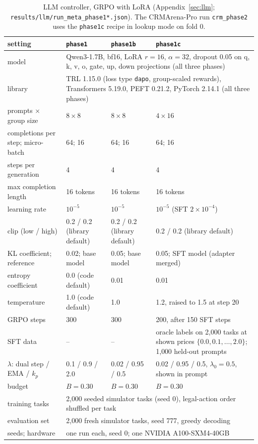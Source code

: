 \documentclass[10pt]{article}
\newcommand{\code}[1]{\texttt{#1}}
\begin{document}
\begin{table}[H]
\centering\footnotesize
\caption{LLM controller, GRPO with LoRA (Appendix~\ref{sec:llm}; \code{results/llm/run\_meta\_phase1*.json}). The CRMArena-Pro run \code{crm\_phase2} uses the \code{phase1c} recipe in lookup mode on fold 0.}
\label{tab:det-llm}
\begin{tabular}{p{4.0cm}p{3.6cm}p{3.6cm}p{3.8cm}}
\toprule
setting & \code{phase1} & \code{phase1b} & \code{phase1c} \\
\midrule
model & \multicolumn{3}{p{11.4cm}}{Qwen3-1.7B, bf16, LoRA $r=16$, $\alpha=32$, dropout 0.05 on q, k, v, o, gate, up, down projections (all three phases)} \\
library & \multicolumn{3}{p{11.4cm}}{TRL 1.15.0 (loss type \code{dapo}, group-scaled rewards), Transformers 5.19.0, PEFT 0.21.2, PyTorch 2.14.1 (all three phases)} \\
prompts $\times$ group size & $8\times8$ & $8\times8$ & $4\times16$ \\
completions per step; micro-batch & 64; 16 & 64; 16 & 64; 16 \\
steps per generation & 4 & 4 & 4 \\
max completion length & 16 tokens & 16 tokens & 16 tokens \\
learning rate & $10^{-5}$ & $10^{-5}$ & $10^{-5}$ (SFT $2\times10^{-4}$) \\
clip (low / high) & 0.2 / 0.2 (library default) & 0.2 / 0.2 (library default) & 0.2 / 0.2 (library default) \\
KL coefficient; reference & 0.02; base model & 0.05; base model & 0.05; SFT model (adapter merged) \\
entropy coefficient & 0.0 (code default) & 0.01 & 0.01 \\
temperature & 1.0 (code default) & 1.0 & 1.2, raised to 1.5 at step 20 \\
GRPO steps & 300 & 300 & 200, after 150 SFT steps \\
SFT data & -- & -- & oracle labels on 2{,}000 tasks at shown prices $\{0.0,0.1,\dots,2.0\}$; 1{,}000 held-out prompts \\
$\lambda$: dual step / EMA / $k_p$ & 0.1 / 0.9 / 2.0 & 0.02 / 0.95 / 0.5 & 0.02 / 0.95 / 0.5, $\lambda_0=0.5$, shown in prompt \\
budget & $B=0.30$ & $B=0.30$ & $B=0.30$ \\
training tasks & \multicolumn{3}{l}{2{,}000 seeded simulator tasks (seed 0), legal-action order shuffled per task} \\
evaluation set & \multicolumn{3}{l}{2{,}000 fresh simulator tasks, seed 777, greedy decoding} \\
seeds; hardware & \multicolumn{3}{l}{one run each, seed 0; one NVIDIA A100-SXM4-40GB} \\
\bottomrule
\end{tabular}
\end{table}
\end{document}
